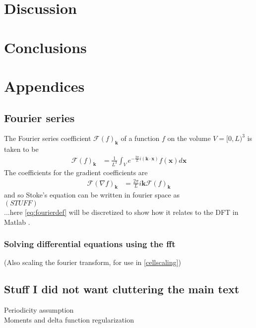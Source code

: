 \documentclass[a4paper,twoside=false,abstract=false,numbers=noenddot,
titlepage=false,headings=small,parskip=half,version=last]{scrartcl}
\begin{document}
\section{Discussion}

\section{Conclusions}





\section{Appendices}
\subsection{Fourier series}
The Fourier series coefficient $\mathcal{F}(f)_{\mathbf{k}}$ of a function $f$ on the volume $V=[0,L)^3$ is taken to be
\begin{align}
\mathcal{F}(f)_{\mathbf{k}} &= \frac{1}{L^3} \int_V e^{-\frac{2\pi}{L}i(\mathbf{k}\cdot \mathbf{x})}f(\mathbf{x})d\mathbf{x}
    \label{eq:fourierdef}
\end{align}
The coefficients for the gradient coefficients are
\begin{align}
\mathcal{F}(\nabla f)_{\mathbf{k}} &= \frac{2\pi}{L}i\mathbf{k} \mathcal{F}(f)_{\mathbf{k}}
\end{align}
and so Stoke's equation can be written in fourier space as \\
$\left(STUFF\right)$\\
...here \eqref{eq:fourierdef} will be discretized to show how it relates to the DFT in Matlab \cite{matlab}.

\subsubsection{Solving differential equations using the fft}
(Also scaling the fourier transform, for use in \ref{cellscaling})
\subsection{Stuff I did not want cluttering the main text}
Periodicity assumption\\
Moments and delta function regularization
\end{document}
